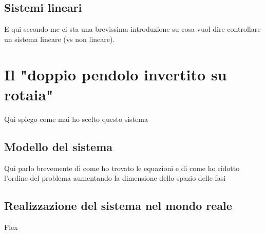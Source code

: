 \subsection{Sistemi lineari}
E qui secondo me ci sta una brevissima introduzione su cosa vuol dire
controllare un sistema lineare (vs non lineare).

\section{Il "doppio pendolo invertito su rotaia"}
Qui spiego come mai ho scelto questo sistema

\subsection{Modello del sistema}
Qui parlo brevemente di come ho trovato le equazioni e di come ho ridotto l'ordine
del problema aumentando la dimensione dello spazio delle fasi

\subsection{Realizzazione del sistema nel mondo reale}
Flex